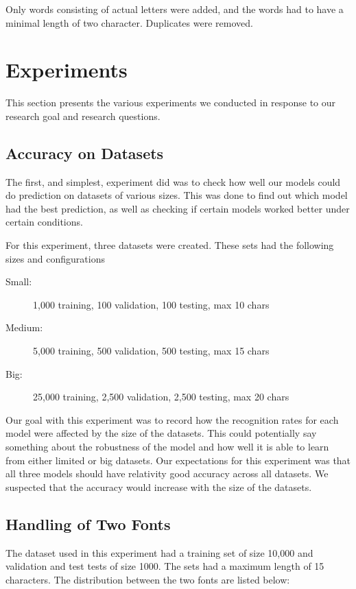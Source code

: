 Only words consisting of actual letters were added, and the words had to have a minimal length of two character. Duplicates were removed.


\section{Experiments}
\label{sec:experiments_details}
This section presents the various experiments we conducted in response to our research goal and research questions.

\subsection{Accuracy on Datasets}
\label{sec:accuracy_on_datasets}
The first, and simplest, experiment did was to check how well our models could do prediction on datasets of various sizes. This was done to find out which model had the best prediction, as well as checking if certain models worked better under certain conditions.

For this experiment, three datasets were created. These sets had the following sizes and configurations

\vspace{0.5cm}
\begin{minipage}{0.8\linewidth}
    \begin{description}
        \item[Small:]{1,000 training, 100 validation, 100 testing, max 10 chars}
        \item[Medium:]{5,000 training, 500 validation, 500 testing, max 15 chars}
        \item[Big:]{25,000 training, 2,500 validation, 2,500 testing, max 20 chars}
    \end{description}
\end{minipage}

Our goal with this experiment was to record how the recognition rates for each model were affected by the size of the datasets. This could potentially say something about the robustness of the model and how well it is able to learn from either limited or big datasets. Our expectations for this experiment was that all three models should have relativity good accuracy across all datasets. We suspected that the accuracy would increase with the size of the datasets.

\subsection{Handling of Two Fonts}
The dataset used in this experiment had a training set of size 10,000 and validation and test tests of size 1000. The sets had a maximum length of 15 characters. The distribution between the two fonts are listed below:

